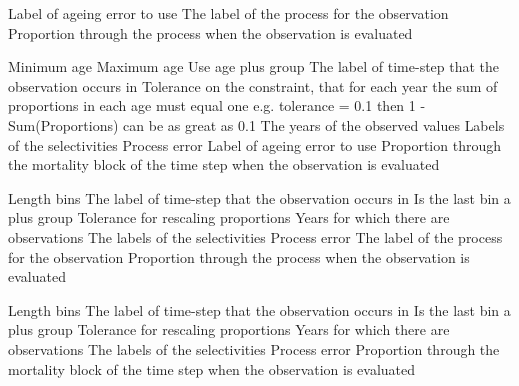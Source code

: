  {Label of ageing error to use}
 {The label of the process for the observation}
 {Proportion through the process when the observation is evaluated}
\par\textbf{}\par
{} {Minimum age}
 {Maximum age}
 {Use age plus group}
 {The label of time-step that the observation occurs in}
 {Tolerance on the constraint, that for each year the sum of proportions in each age must equal one e.g. tolerance = 0.1 then 1 - Sum(Proportions) can be as great as 0.1}
 {The years of the observed values}
 {Labels of the selectivities}
 {Process error}
 {Label of ageing error to use}
 {Proportion through the mortality block of the time step when the observation is evaluated}
\par\textbf{}\par
{} {Length bins}
 {The label of time-step that the observation occurs in}
 {Is the last bin a plus group}
 {Tolerance for rescaling proportions}
 {Years for which there are observations}
 {The labels of the selectivities}
 {Process error}
 {The label of the process for the observation}
 {Proportion through the process when the observation is evaluated}
\par\textbf{}\par
{} {Length bins}
 {The label of time-step that the observation occurs in}
 {Is the last bin a plus group}
 {Tolerance for rescaling proportions}
 {Years for which there are observations}
 {The labels of the selectivities}
 {Process error}
 {Proportion through the mortality block of the time step when the observation is evaluated}
\par\textbf{}\par
